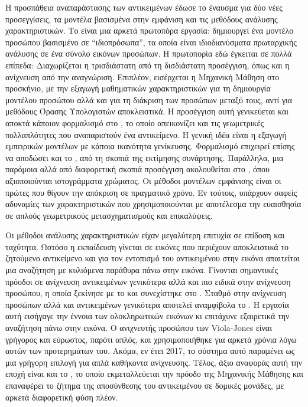 \documentclass[11pt,a4paper,english,greek,twoside]{../Thesis}
\begin{document}
\par Η προσπάθεια αναπαράστασης των αντικειμένων έδωσε το έναυσμα για δύο νέες προσεγγίσεις, τα μοντέλα βασισμένα στην εμφάνιση και τις μεθόδους ανάλυσης χαρακτηριστικών. Το \cite{turk_1991} είναι μια αρκετά πρωτοπόρα εργασία: δημιουργεί ένα μοντέλο προσώπου βασισμένο σε “ιδιοπρόσωπα”, τα οποία είναι ιδιοδιανύσματα πρωταρχικής ανάλυσης σε ένα σύνολο εικόνων προσώπων. Η πρωτοπορία εδώ έγκειται σε πολλά επίπεδα: Διαχωρίζεται η τρισδιάστατη από τη δισδιάστατη προσέγγιση, όπως και η ανίχνευση από την αναγνώριση. Επιπλέον, εισέρχεται η Μηχανική Μάθηση στο προσκήνιο, με την εξαγωγή μαθηματικών χαρακτηριστικών για τη δημιουργία μοντέλου προσώπου αλλά και για τη διάκριση των προσώπων μεταξύ τους, αντί για μεθόδους Όρασης Υπολογιστών αποκλειστικά. Η προσέγγιση αυτή γενικεύεται και αποκτά κάποιον φορμαλισμό στο \cite{murase_1995}, το οποίο απεικονίζει και τις γεωμετρικές πολλαπλότητες που αναπαριστούν ένα αντικείμενο. Η γενική ιδέα είναι η εξαγωγή εμπειρικών μοντέλων με κάποια ικανότητα γενίκευσης. Φορμαλισμό επιχειρεί επίσης να αποδώσει και το \cite{sung_2001}, από τη σκοπιά της εκτίμησης συνάρτησης. Παράλληλα, μια παρόμοια αλλά από διαφορετική σκοπιά προσέγγιση ακολουθείται στο \cite{swain_1991}, όπου αξιοποιούνται ιστογράμματα χρώματος. Οι μέθοδοι μοντέλων εμφάνισης είναι οι πρώτες που θίγουν την απόκριση σε πραγματικό χρόνο. Εν τούτοις, υπάρχουν σαφείς αδυναμίες των χαρακτηριστικών που χρησιμοποιούνται με αποτέλεσμα την ευαισθησία σε απλούς γεωμετρικούς μετασχηματισμούς και επικαλύψεις.

\par Οι μέθοδοι ανάλυσης χαρακτηριστικών είχαν μεγαλύτερη επιτυχία σε επίδοση και ταχύτητα. Ωστόσο η εκπαίδευση γίνεται σε εικόνες που περιέχουν αποκλειστικά το ζητούμενο αντικείμενο και για τον εντοπισμό του αντικειμένου στην εικόνα απαιτείται μια αναζήτηση με κυλιόμενα παράθυρα πάνω στην εικόνα. Γίνονται σημαντικές πρόοδοι σε ανίχνευση αντικειμένων γενικότερα αλλά και πιο ειδικά στην ανίχνευση προσώπου, η οποία ξεκίνησε με το \cite{turk_1991} και συνεχίστηκε στο \cite{belhumeur_1997}. Σταθμό στην ανίχνευση προσώπων αλλά και αντικειμένων γενικότερα αποτελεί αναμφίβολα το \cite{viola_2001}. Η εργασία αυτή εισήγαγε την έννοια των ολοκληρωτικών εικόνων κι επιτάχυνε εξαιρετικά την αναζήτηση πάνω στην εικόνα. Ο ανιχνευτής προσώπου των Viola-Jones είναι γρήγορος και εύρωστος, παρότι απλός, και χρησιμοποιήθηκε για αρκετά χρόνια λόγω αυτών των προτερημάτων του. Ακόμα, εν έτει 2017, το σύστημα αυτό παραμένει ως μια γρήγορη επιλογή για απλά καθήκοντα ανίχνευσης. Τέλος, άξιο αναφοράς αυτή την εποχή είναι και το \cite{schneiderman_2004}, το οποίο εκμεταλλεύεται την πρόοδο της Μηχανικής Μάθησης και επαναφέρει το ζήτημα της αποσύνθεσης του αντικειμένου σε δομικές μονάδες, με αρκετά διαφορετική φύση πλέον.
\end{document}
